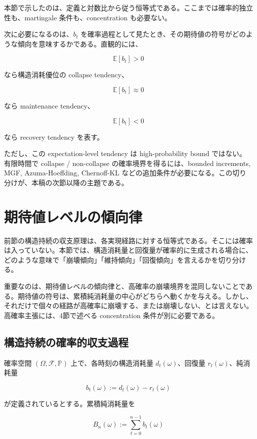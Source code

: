 \documentclass[12pt,a4paper]{article}
\begin{document}
本節で示したのは、定義と対数比から従う恒等式である。ここまでは確率的独立性も、martingale 条件も、concentration も必要ない。

次に必要になるのは、\(b_{t}\) を確率過程として見たとき、その期待値の符号がどのような傾向を意味するかである。直観的には、

\[
\mathbb E[b_{t}] > 0
\]

なら構造消耗優位の collapse tendency、

\[
\mathbb E[b_{t}] \approx 0
\]

なら maintenance tendency、

\[
\mathbb E[b_{t}] < 0
\]

なら recovery tendency を表す。

ただし、この expectation-level tendency は high-probability bound ではない。有限時間で collapse / non-collapse の確率境界を得るには、bounded increments, MGF, Azuma-Hoeffding, Chernoff-KL などの追加条件が必要になる。この切り分けが、本稿の次節以降の主題である。

\section{期待値レベルの傾向律}\label{ux671fux5f85ux5024ux30ecux30d9ux30ebux306eux50beux5411ux5f8b}

前節の構造持続の収支原理は、各実現経路に対する恒等式である。そこには確率は入っていない。本節では、構造消耗量と回復量が確率的に生成される場合に、どのような意味で「崩壊傾向」「維持傾向」「回復傾向」を言えるかを切り分ける。

重要なのは、期待値レベルの傾向律と、高確率の崩壊境界を混同しないことである。期待値の符号は、累積純消耗量の中心がどちらへ動くかを与える。しかし、それだけで個々の経路が高確率に崩壊する、または崩壊しない、とは言えない。高確率主張には、4節で述べる concentration 条件が別に必要である。

\subsection{構造持続の確率的収支過程}\label{ux69cbux9020ux6301ux7d9aux306eux78baux7387ux7684ux53ceux652fux904eux7a0b}

確率空間 \((\Omega,\mathcal F,\mathbb P)\) 上で、各時刻の構造消耗量 \(d_{t}(\omega)\)、回復量 \(r_{t}(\omega)\)、純消耗量

\[
b_{t}(\omega) := d_{t}(\omega)-r_{t}(\omega)
\]

が定義されているとする。累積純消耗量を

\[
B_{n}(\omega) := \sum_{t=0}^{n-1} b_{t}(\omega)
\]
\end{document}
